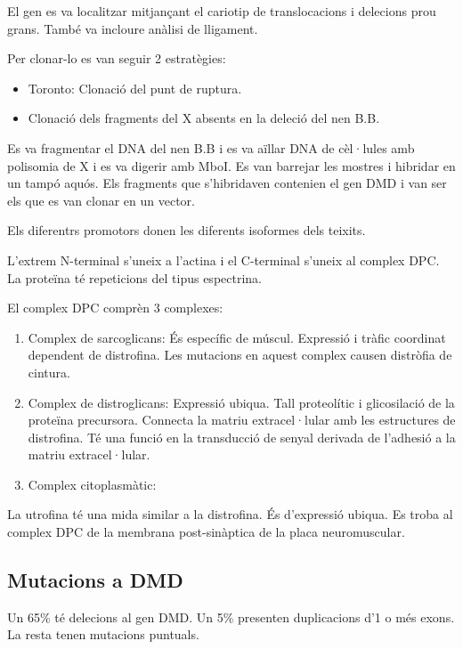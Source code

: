 El gen es va localitzar mitjançant el cariotip de translocacions i
delecions prou grans. També va incloure anàlisi de lligament.

Per clonar-lo es van seguir 2 estratègies:
\begin{itemize}
\item Toronto: Clonació del punt de ruptura.

\item Clonació dels fragments del X absents en la deleció del nen B.B.
\end{itemize}

Es va fragmentar el DNA del nen B.B i es va aïllar DNA de cèl·lules
amb polisomia de X i es va digerir amb MboI. Es van barrejar les
mostres i hibridar en un tampó aquós. Els fragments que s'hibridaven
contenien el gen DMD i van ser els que es van clonar en un vector.

Els diferentrs promotors donen les diferents isoformes dels teixits.

L'extrem N-terminal s'uneix a l'actina i el C-terminal s'uneix al
complex DPC. La proteïna té repeticions del tipus espectrina.

El complex DPC comprèn 3 complexes:
\begin{enumerate}
\item Complex de sarcoglicans: És específic de múscul. Expressió i
  tràfic coordinat dependent de distrofina. Les mutacions en aquest
  complex causen distròfia de cintura.
  
\item Complex de distroglicans: Expressió ubiqua. Tall proteolític i
  glicosilació de la proteïna precursora. Connecta la matriu
  extracel·lular amb les estructures de distrofina. Té una funció en
  la transducció de senyal derivada de l'adhesió a la matriu
  extracel·lular.
  
\item Complex citoplasmàtic:
\end{enumerate}

La utrofina té una mida similar a la distrofina. És d'expressió
ubiqua. Es troba al complex DPC de la membrana post-sinàptica de la
placa neuromuscular.

\subsection{Mutacions a DMD}
\label{sec:mutacions-DMD}
Un 65\% té delecions al gen DMD. Un 5\% presenten duplicacions d'1 o
més exons. La resta tenen mutacions puntuals.

